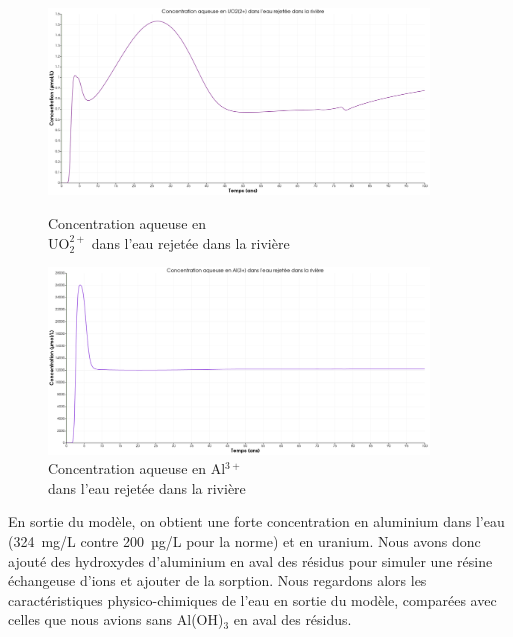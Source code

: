 \documentclass{article}
\begin{document}
\begin{figure}[H]
    \centering
    \begin{minipage}{0.5\textwidth}
        \centering
        \includegraphics[width=0.9\textwidth]{III_B_2_20.png} 
        \caption{Concentration aqueuse en \\UO$_2^{2+}$ dans l'eau rejetée dans la rivière}
        \label{fig:UO2_riviere_Al}
    \end{minipage}\hfill
    \begin{minipage}{0.5\textwidth}
        \centering
        \includegraphics[width=0.9\textwidth]{III_B_2_21.png} 
        \caption{Concentration aqueuse en Al$^{3+}$ \\dans l'eau rejetée dans la rivière}
        \label{fig:Al_riviere_Al}
    \end{minipage}
\end{figure}


En sortie du modèle, on obtient une forte concentration en aluminium dans l’eau (324~mg/L contre 200~µg/L pour la norme) et en uranium. Nous avons donc ajouté des hydroxydes d’aluminium en aval des résidus pour simuler une résine échangeuse d’ions et ajouter de la sorption.
Nous regardons alors les caractéristiques physico-chimiques de l’eau en sortie du modèle, comparées avec celles que nous avions sans Al(OH)$_3$ en aval des résidus.
\end{document}
